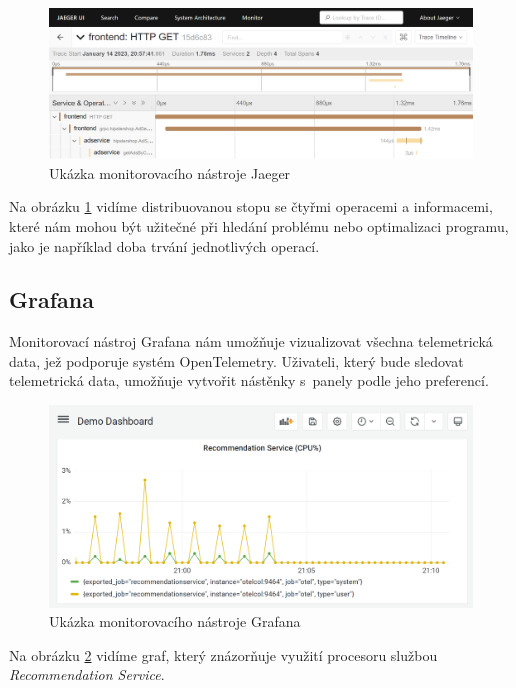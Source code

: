 \begin{figure}[H]
  \centering
  \includegraphics[width=15cm]{obrazky-figures/jaegerTrace.png}
  \caption{Ukázka monitorovacího nástroje Jaeger}
  \label{fig:jaegerTrace}
\end{figure}

Na obrázku \ref{fig:jaegerTrace} vidíme distribuovanou stopu se čtyřmi operacemi a informacemi, které nám mohou být užitečné při hledání problému nebo optimalizaci programu, jako je například doba trvání jednotlivých operací.

\subsection{Grafana}

Monitorovací nástroj Grafana nám umožňuje vizualizovat všechna telemetrická data, jež podporuje systém OpenTelemetry. Uživateli, který bude sledovat telemetrická data, umožňuje vytvořit nástěnky s~panely podle jeho preferencí.

\begin{figure}[H]
  \centering
  \includegraphics[width=15cm]{obrazky-figures/grafana.png}
  \caption{Ukázka monitorovacího nástroje Grafana}
  \label{fig:grafana}
\end{figure}

Na obrázku \ref{fig:grafana} vidíme graf, který znázorňuje využití procesoru službou \textit{Recommendation Service}.

